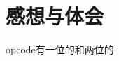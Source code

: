 \documentclass[UTF8,a4paper,10pt]{ctexart}
\begin{document}
\section{感想与体会}
opcode有一位的和两位的




















































\end{document}
